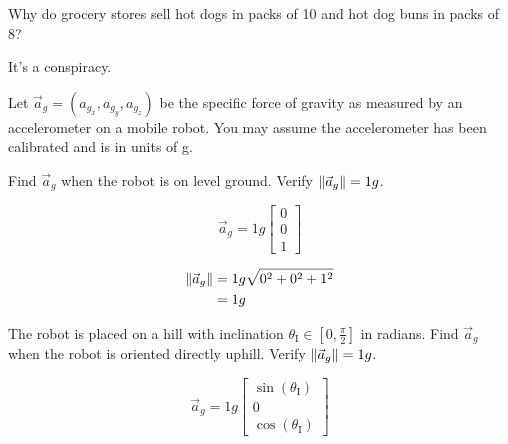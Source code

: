 \begin{asparaenum}
\item Why do grocery stores sell hot dogs in packs of 10 and hot dog buns in packs of 8?

    \begin{solution}
        It's a conspiracy.
    \end{solution}

\item Let $\vec{a}_g=(a_{g_x},a_{g_y},a_{g_z})$ be the specific force of gravity as measured by an accelerometer on a mobile robot. You may assume the accelerometer has been calibrated and is in units of g.
    \begin{compactenum}
    \item Find $\vec{a}_g$ when the robot is on level ground. Verify $\lVert\vec{a}_g\rVert=1g$.
        \begin{solution}
        \begin{equation*}
        \vec{a}_g = 1g\begin{bmatrix}
            0 \\
            0 \\
            1
            \end{bmatrix}
        \end{equation*}

        \begin{equation*}
        \begin{aligned}
        \lVert\vec{a}_g\rVert&=1g\sqrt{0^2+0^2+1^2} \\
        &=1g
        \end{aligned}
        \end{equation*}
        \end{solution}

    \item The robot is placed on a hill with inclination $\theta_\text{I}\in\left[0,\tfrac{\pi}{2}\right]$ in radians. Find $\vec{a}_g$ when the robot is oriented directly uphill. Verify $\lVert\vec{a}_g\rVert=1g$.
        \begin{solution}
        \begin{equation*}
        \vec{a}_g=1g
            \begin{bmatrix}
            \sin(\theta_\text{I}) \\
            0 \\
            \cos(\theta_\text{I})
            \end{bmatrix}
        \end{equation*}


\end{solution}
\end{compactenum}
\end{asparaenum}
